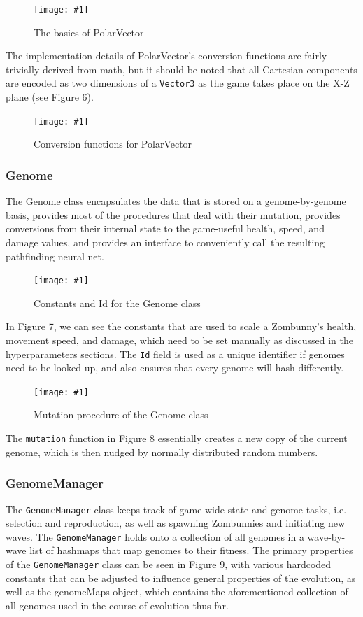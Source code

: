 \documentclass[letterpaper]{article}
\def\imfig#1#2{\begin{figure}[h] \centering \texttt{[image: \#1]} \caption{#2} \end{figure}}
\def\imfigB#1#2{\begin{figure} \centering \texttt{[image: \#1]} \caption{#2} \end{figure}}
\begin{document}
\imfigB{PolarVector1}{The basics of PolarVector}

The implementation details of PolarVector's conversion functions are fairly
trivially derived from math, but it should be noted that all Cartesian
components are encoded as two dimensions of a \texttt{Vector3} as the game takes
place on the X-Z plane (see Figure 6).

\imfigB{PolarVector2}{Conversion functions for PolarVector}

\subsubsection{Genome}
The Genome class encapsulates the data that is stored on a genome-by-genome
basis, provides most of the procedures that deal with their mutation, provides
conversions from their internal state to the game-useful health, speed, and
damage values, and provides an interface to conveniently call the resulting
pathfinding neural net.

\imfigB{Genome1}{Constants and Id for the Genome class}

In Figure 7, we can see the constants that are used to scale a Zombunny's
health, movement speed, and damage, which need to be set manually as discussed
in the hyperparameters sections. The \texttt{Id} field is used as a unique identifier if
genomes need to be looked up, and also ensures that every genome will hash differently.

\imfig{Mutation}{Mutation procedure of the Genome class}

The \texttt{mutation} function in Figure 8 essentially creates a new copy of the current genome, which is then nudged by normally distributed random numbers.

\subsubsection{GenomeManager}

The \texttt{GenomeManager} class keeps track of game-wide state and genome tasks, i.e.
selection and reproduction, as well as spawning Zombunnies and initiating new
waves. The \texttt{GenomeManager} holds onto a collection of all genomes in a
wave-by-wave list of hashmaps that map genomes to their fitness. The primary
properties of the \texttt{GenomeManager} class can be seen in Figure 9, with various
hardcoded constants that can be adjusted to influence general properties of the
evolution, as well as the genomeMaps object, which contains the aforementioned
collection of all genomes used in the course of evolution thus far.
\end{document}
